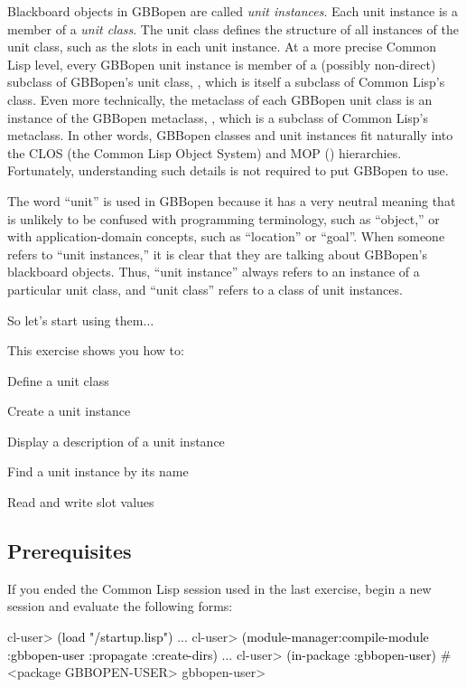 \documentclass[10pt,twoside,english,pdftex]{article}
\begin{document}
Blackboard objects in GBBopen are called \textit{unit instances}. Each unit
instance is a member of a \textit{unit class}.  The unit class defines the
structure of all instances of the unit class, such as the slots in each unit
instance.  At a more precise Common Lisp level, every GBBopen unit instance is
member of a (possibly non-direct) subclass of GBBopen's unit class,
, which is itself a subclass of Common
Lisp's  class.  Even more technically, the
metaclass of each GBBopen unit class is an instance of the GBBopen metaclass,
, which is a subclass of Common Lisp's
 metaclass.  In other words, GBBopen classes and
unit instances fit naturally into the CLOS (the Common Lisp Object System) and
MOP ()
hierarchies. Fortunately, understanding such details is not required to put
GBBopen to use.

The word ``unit'' is used in GBBopen because it has a very neutral meaning
that is unlikely to be confused with programming terminology, such as
``object,'' or with application-domain concepts, such as ``location'' or
``goal''.  When someone refers to ``unit instances,'' it is clear that they
are talking about GBBopen's blackboard objects.  Thus, ``unit instance''
always refers to an instance of a particular unit class, and ``unit class''
refers to a class of unit instances.

So let's start using them$\ldots$

\fndocrule

This exercise shows you how to:
\begin{tightitemize}
\item Define a unit class
\item Create a unit instance
\item Display a description of a unit instance
\item Find a unit instance by its name
\item Read and write slot values
\end{tightitemize}

\fndocrule

\subsection*{Prerequisites}

%
%
If you ended the Common Lisp session used in the last exercise, begin a new
session and evaluate the following forms:
%
\W\supp
\begin{example}
\textcolor{darkergray}{%
  cl-user> \textcolor{black}{(load "/startup.lisp")}
     ...
  cl-user> \textcolor{black}{(module-manager:compile-module :gbbopen-user :propagate :create-dirs)}
     ...
  cl-user> \textcolor{black}{(in-package :gbbopen-user)}
  #<package GBBOPEN-USER>
  gbbopen-user>}
\end{example}
\end{document}
